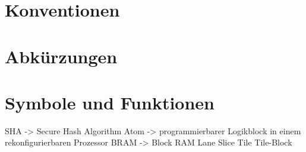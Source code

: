\section{Konventionen}

\section{Abkürzungen}

\section{Symbole und Funktionen}

SHA -> Secure Hash Algorithm
Atom -> programmierbarer Logikblock in einem rekonfigurierbaren Prozessor
BRAM -> Block RAM
Lane
Slice
Tile
Tile-Block